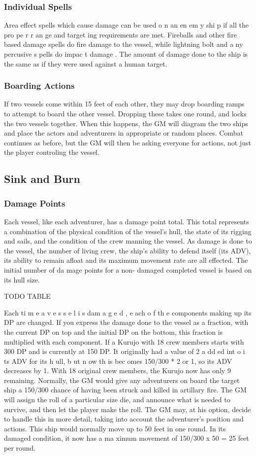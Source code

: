 \begin{multicols*}{2}
\subsubsection{Individual Spells}
Area effect spells which cause damage can be used
o n an en em y shi p if all the pro pe r r an ge and target ing
requirements are met. Fireballs and other fire based damage
spells do fire damage to the vessel, while lightning bolt and
a ny percusive s pells do impac t damage . The amount of
damage done to the ship is the same as if they were used
against a human target.
\subsubsection{Boarding Actions}
If two vessels come within 15 feet of each other,
they may drop boarding ramps to attempt to board the other
vessel. Dropping these takes one round, and locks the two
vessels together. When this happens, the GM will diagram the
two ships and place the actors and adventurers in appropriate
or random places. Combat continues as before, but the GM
will then be asking everyone for actions, not just the player
controling the vessel.
\subsection{Sink and Burn}
\subsubsection{Damage Points}
Each vessel, like each adventurer, has a damage
point total. This total represents a combination of the physical
condition of the vessel’s hull, the state of its rigging and sails,
and the condition of the crew manning the vessel. As damage
is done to the vessel, the number of living crew, the ship’s
ability to defend itself (its ADV), its ability to remain afloat
and its maximum movement rate are all effected.
The initial number of da mage points for a non-
damaged completed vessel is based on its hull size.

TODO TABLE 

Each ti m e a v e s s e l i s dam a g e d , e ach o f th e
components making up its DP are changed. If you express the
damage done to the vessel as a fraction, with the current DP
on top and the initial DP on the bottom, this fraction is
multiplied with each component.
If a Kurujo with 18 crew members starts with 300
DP and is currently at 150 DP. It originally had a value of 2
a dd ed int o i ts ADV for its h ull, b ut n ow th is bec omes
150/300 * 2 or 1, so its ADV decreases by 1.
With 18 original crew members, the Kurujo now
has only 9 remaining. Normally, the GM would give any
adventurers on board the target ship a 150/300 chance of
having been struck and killed in artillary fire. The GM will
assign the roll of a particular size die, and announce what is
needed to survive, and then let the player make the roll. The
GM may, at his option, decide to handle this in more detail,
taking into account the adventurer’s position and actions.
This ship would normally move up to 50 feet in one
round. In its damaged condition, it now has a ma ximum
movement of 150/300 x 50 = 25 feet per round.

\end{multicols*}
